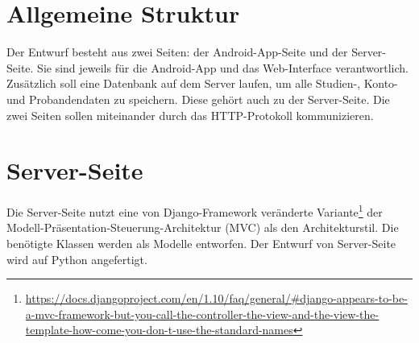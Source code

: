 \documentclass[a4paper]{scrreprt}
\begin{document}
    \tableofcontents

    \chapter{Allgemeine Struktur}

        Der Entwurf besteht aus zwei Seiten: der Android-App-Seite und der Server-Seite. Sie sind jeweils für die Android-App und das Web-Interface verantwortlich. Zusätzlich soll eine Datenbank auf dem Server laufen, um alle Studien-, Konto- und Probandendaten zu speichern. Diese gehört auch zu der Server-Seite. Die zwei Seiten sollen miteinander durch das HTTP-Protokoll kommunizieren.

    \chapter{Server-Seite}
        Die Server-Seite nutzt eine von Django-Framework veränderte Variante\footnote{\href{https://docs.djangoproject.com/en/1.10/faq/general/\#django-appears-to-be-a-mvc-framework-but-you-call-the-controller-the-view-and-the-view-the-template-how-come-you-don-t-use-the-standard-names}{https://docs.djangoproject.com/en/1.10/faq/general/\#django-appears-to-be-a-mvc-framework-but-you-call-the-controller-the-view-and-the-view-the-template-how-come-you-don-t-use-the-standard-names}} der Modell-Präsentation-Steuerung-Architektur (MVC) als den Architekturstil. Die benötigte Klassen werden als Modelle entworfen. Der Entwurf von Server-Seite wird auf Python angefertigt.
\end{document}
